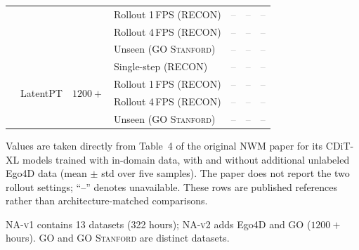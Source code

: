 \documentclass{article}
\newcommand{\TBD}{\textcolor{gray}{--}}
\newcommand{\NAvOne}{\textsc{NA-v1}}
\newcommand{\NAvTwo}{\textsc{NA-v2}}
\newcommand{\UnseenData}{\textsc{GO Stanford}}
\begin{document}
\begin{table}[t]
\begin{threeparttable}
\begin{tabular}{lll lccc}
      & & & Rollout 1\,FPS (RECON) & \TBD & \TBD & \TBD \\
      & & & Rollout 4\,FPS (RECON) & \TBD & \TBD & \TBD \\
      & & & Unseen (\UnseenData{}) & \TBD & \TBD & \TBD \\
      \addlinespace[2pt]
      & \multirow{4}{*}{LatentPT} & \multirow{4}{*}{$1200{+}$}
      & Single-step (RECON) & \TBD & \TBD & \TBD \\
      & & & Rollout 1\,FPS (RECON) & \TBD & \TBD & \TBD \\
      & & & Rollout 4\,FPS (RECON) & \TBD & \TBD & \TBD \\
      & & & Unseen (\UnseenData{}) & \TBD & \TBD & \TBD \\
      \bottomrule
    \end{tabular}
    \begin{tablenotes}[flushleft]\footnotesize
      \item[a] Values are taken directly from Table~4 of the original NWM paper
      for its CDiT-XL models trained with in-domain data, with and without
      additional unlabeled Ego4D data (mean $\pm$ std over five samples).
      The paper does not report the two rollout settings; ``--'' denotes unavailable.
      These rows are published references rather than architecture-matched comparisons.
      \item \NAvOne{} contains 13 datasets (322 hours); \NAvTwo{} adds Ego4D
      and GO ($1200{+}$ hours). GO and \UnseenData{} are distinct datasets.
    \end{tablenotes}
  \end{threeparttable}
\end{table}
\end{document}
